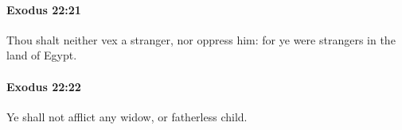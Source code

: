 		\paragraph{Exodus 22:21} %
			\label{EXODUS-22-21}

			Thou shalt neither vex a stranger, nor oppress him: for ye were strangers in the land of Egypt.


		\paragraph{Exodus 22:22} %
			\label{EXODUS-22-22}

			Ye shall not afflict any widow, or fatherless child.


